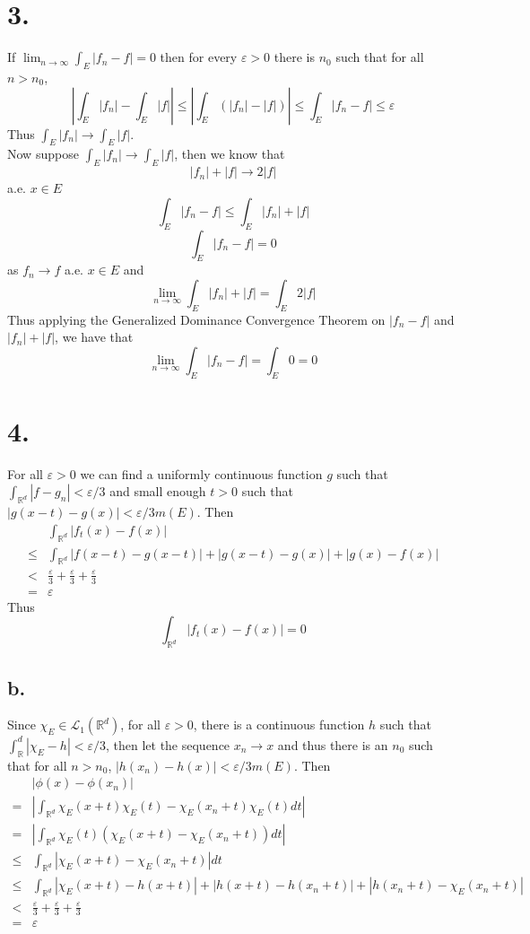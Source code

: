 \documentclass[11pt]{article}
\theoremstyle{mystyle}
\theoremstyle{definition}
\begin{document}
\section*{3.}
If $\lim_{n \to \infty} \int_E |f_n - f| = 0$ then for every $\varepsilon > 0$ there is $n_0$ such that for all $n > n_0$,  
\[
  \left|\int_E |f_n| - \int_E |f|\right| \le \left|\int_E (|f_n| - |f|) \right| \le  \int_E |f_n - f| \le \varepsilon
\]
Thus $\int_E |f_n| \to \int_E |f|$. \\
Now suppose $\int_E |f_n| \to \int_E |f|$, then we know that 
\[ 
  |f_n| + |f| \to 2|f|
\] 
a.e. $x \in E$  
\[
  \int_E |f_n - f| \le \int_E |f_n| + |f|
\] 
\[
  \int_E |f_n - f| = 0
\]
as $f_n \to f$ a.e. $x \in E$ and 
\[
  \lim_{n \to \infty} \int_E |f_n| + |f| = \int_E 2|f|
\]
Thus applying the Generalized Dominance Convergence Theorem on $|f_n - f|$ and $|f_n|+|f|$, we have that 
\[
  \lim_{n \to \infty} \int_E |f_n - f| = \int_E 0 = 0
\]
\newpage
\section*{4.}
For all $\varepsilon >0 $ we can find a uniformly continuous function $g$ such that $\int_{\mathbb{R}^d} |f-g_n| < \varepsilon/3$ and small enough $t>0$ such that $|g(x-t) - g(x)| < \varepsilon / 3m(E)$. Then 
\begin{align*}
  & \int_{\mathbb{R}^d} |f_t(x) - f(x)| \\
  \le& \int_{\mathbb{R}^d} |f(x-t) - g(x-t)| + |g(x-t) - g(x)| + |g(x) - f(x)| \\
  <& \displaystyle\frac{\varepsilon}{3} + \displaystyle\frac{\varepsilon}{3} + \displaystyle\frac{\varepsilon}{3} \\
  =& \varepsilon
\end{align*}
Thus 
\[
  \int_{\mathbb{R}^d} |f_t(x) - f(x)| = 0
\]
\subsection*{b.}
Since $\chi_E \in \mathcal{L}_1(\mathbb{R}^d)$, for all $\varepsilon > 0$, there is a continuous function $h$ such that $\int_\mathbb{R}^d |\chi_E - h| < \varepsilon / 3$, then let the sequence $x_n \to x$ and thus there is an $n_0$ such that for all $n > n_0$, $|h(x_n) - h(x)| < \varepsilon/3m(E)$. Then
\begin{align*}
  & |\phi(x) - \phi(x_n)| \\
  =& \left| \int_{\mathbb{R}^d} \chi_E(x+t) \chi_E(t) - \chi_E(x_n+t) \chi_E(t) dt \right|\\
  =& \left|\int_{\mathbb{R}^d} \chi_E(t)\left( \chi_E(x+t) - \chi_E(x_n+t)  \right) dt \right| \\
  \le & \int_{\mathbb{R}^d} |\chi_E(x+t) - \chi_E(x_n+t) | dt \\
  \le & \int_{\mathbb{R}^d} |\chi_E(x+t) - h(x+t)| + |h(x+t) - h(x_n+t)| + |h(x_n+t) - \chi_E (x_n+t) | \\
  < & \displaystyle\frac{\varepsilon}{3} + \displaystyle\frac{\varepsilon}{3} + \displaystyle\frac{\varepsilon}{3} \\
  = & \varepsilon
\end{align*}
\end{document}
